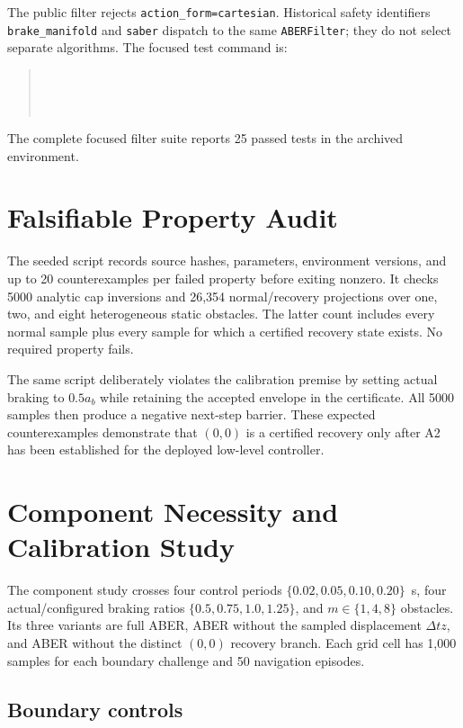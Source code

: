 \documentclass[letterpaper]{article}
\begin{document}
The public filter rejects \texttt{action\_form=cartesian}.  Historical safety
identifiers \texttt{brake\_manifold} and \texttt{saber} dispatch to the same
\texttt{ABERFilter}; they do not select separate algorithms.  The focused
test command is:
\begin{quote}
\noindent{}\ \ \ \par
\noindent{}\ \ \ 
\end{quote}
The complete focused filter suite reports 25 passed tests in the archived
environment.

\section{Falsifiable Property Audit}

The seeded script
 records source hashes,
parameters, environment versions, and up to 20 counterexamples per failed
property before exiting nonzero.  It checks 5000 analytic cap inversions and
26,354 normal/recovery projections over one, two, and eight heterogeneous
static obstacles.  The latter count includes every normal sample plus every
sample for which a certified recovery state exists.  No required property
fails.

The same script deliberately violates the calibration premise by setting
actual braking to $0.5a_b$ while retaining the accepted envelope in the
certificate.  All 5000 samples then produce a negative next-step barrier.
These expected counterexamples demonstrate that $(0,0)$ is a certified
recovery only after A2 has been established for the deployed low-level
controller.

\section{Component Necessity and Calibration Study}

The component study crosses four control periods
$\{0.02,0.05,0.10,0.20\}$~s, four actual/configured braking ratios
$\{0.5,0.75,1.0,1.25\}$, and $m\in\{1,4,8\}$ obstacles.  Its three
variants are full ABER, ABER without the sampled displacement $\Delta t z$,
and ABER without the distinct $(0,0)$ recovery branch.  Each grid cell has
1,000 samples for each boundary challenge and 50 navigation episodes.

\subsection{Boundary controls}
\end{document}
